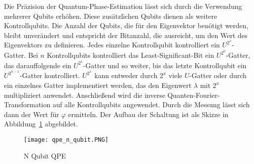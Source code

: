 Die Präzision der Quantum-Phase-Estimation lässt sich durch die Verwendung mehrerer Qubits erhöhen.
Diese zusätzlichen Qubits dienen als weitere Kontrollqubits.
Die Anzahl der Qubits, die für den Eigenvektor benötigt werden, 
bleibt unverändert und entspricht der Bitanzahl, 
die ausreicht, um den Wert des Eigenvektors zu definieren.
Jedes einzelne Kontrollqubit kontrolliert ein \(U^{2^x}\)-Gatter.
Bei \(n\) Kontrollqubits kontrolliert das Least-Significant-Bit ein \(U^{2^0}\)-Gatter,
das darauffolgende ein \(U^{2^1}\)-Gatter und so weiter,
bis das letzte Kontrollqubit ein \(U^{2^{n-1}}\)-Gatter kontrolliert.
\(U^{2^x}\) kann entweder durch \(2^x\) viele \(U\)-Gatter oder durch ein einzelnes Gatter implementiert werden, 
das den Eigenwert \(\lambda\) mit \(2^x\) multipliziert anwendet.
Anschließend wird die inverse Quanten-Fourier-Transformation auf alle Kontrollqubits angewendet.
Durch die Messung lässt sich dann der Wert für \(\varphi\) ermitteln.
Der Aufbau der Schaltung ist als Skizze in Abbildung~\ref{fig:qpe_n_qubit} abgebildet.

\begin{figure}[H]
  \centering
  \texttt{[image: qpe\_n\_qubit.PNG]}
  \caption{N Qubit QPE}
  \label{fig:qpe_n_qubit}
\end{figure}

